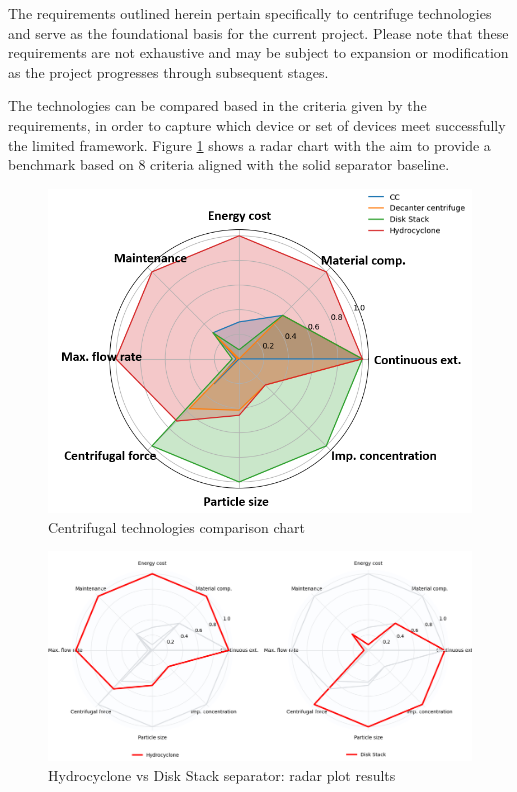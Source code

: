 \begin{tcolorbox}[colback=gray!5!white,colframe=gray!75!black,title=Disclaimer]
	The requirements outlined herein pertain specifically to centrifuge technologies and serve as the foundational basis for the current project. Please note that these requirements are not exhaustive and may be subject to expansion or modification as the project progresses through subsequent stages. 
\end{tcolorbox}

\noindent The technologies can be compared based in the criteria given by the requirements, in order to capture which device or set of devices meet successfully the limited framework. Figure \ref{rad_chart} shows a radar chart with the aim to provide a benchmark based on 8 criteria aligned with the solid separator baseline.  

\begin{figure}[H]
	\centering
	\includegraphics[width=0.85\linewidth]{rad_chart.png}
	\captionsetup{font=bf, size=small}
	\caption{Centrifugal technologies comparison chart}
	\label{rad_chart}
\end{figure}
\begin{figure}[H]
	\centering
	\includegraphics[width=1\linewidth]{rad_chart_comp.png}
	\captionsetup{font=bf, size=small}
	\caption{Hydrocyclone vs Disk Stack separator: radar plot results}
	\label{rad_chart_comp}
\end{figure}

